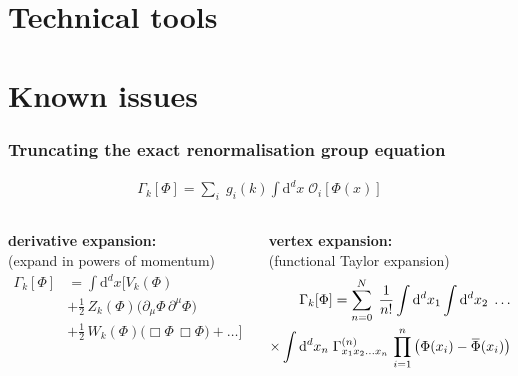 \documentclass[]{beamer}  %
\newcommand{\overbar}[1]{\mkern 1.5mu\overline{\mkern-1.5mu#1\mkern-1.5mu}\mkern 1.5mu}
\begin{document}
\section{Technical tools}

\section{Known issues}



\begin{frame}
  \frametitle{Truncating the exact renormalisation group equation}

  \vspace{-33pt}
  \begin{align*}
    \boxed{
      \Gamma_k[\Phi] = \sum_i \; g_i(k) \! \int \mathrm d^d x \; \mathcal O_i [\Phi(x)]
    }
  \end{align*}

  \vspace{-15pt}
  \begin{columns}[T]

    \begin{column}{.5\textwidth}
      \begin{center}
        \textbf{derivative expansion:}\\
        (expand in powers of momentum)
        \begin{align*}
          \Gamma_k [\Phi] &=
          \int \mathrm d^dx
          \bigg[
            V_k (\Phi)\\
            &+ \frac 12 \, Z_k (\Phi) \big( \partial_\mu \Phi \, \partial^\mu \Phi \big)\\
            &+ \frac 12 \, W_k (\Phi) \big( \Box \Phi \, \Box \Phi \big)
            + \dots
          \bigg]
        \end{align*}
      \end{center}
    \end{column}

    \begin{column}{.5\textwidth}
      \begin{center}
        \textbf{vertex expansion:}\\
        (functional Taylor expansion)
        \begin{align*}
          \Gamma_k [\Phi] =
          \sum_{n=0}^{N} \; \frac{1}{n!}
          \int \mathrm d^dx_1
          \int \mathrm d^dx_2
          \; \dots \\
          \times \int \mathrm d^dx_n \;
          \Gamma_{x_1 x_2 \dots x_n}^{(n)} \,
          \prod_{i=1}^n
          \big( \Phi(x_i) - \overbar\Phi(x_i) \big)
        \end{align*}
      \end{center}
    \end{column}

  \end{columns}
\end{frame}
\end{document}
